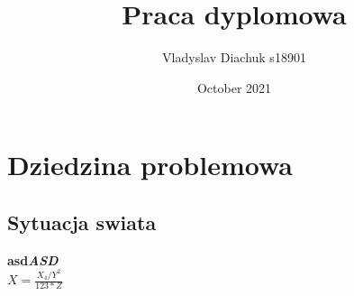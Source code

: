 \documentclass{report}
\title{Praca dyplomowa}
\author{Vladyslav Diachuk s18901}
\date{October 2021}
\begin{document}
	
	\maketitle
	
\chapter{Dziedzina problemowa}

\section{Sytuacja swiata}
\textbf{asd\textit{ASD}}
\\

$X = \frac{X_{4}/Y^{2}}{123*Z}$
	
\end{document}

